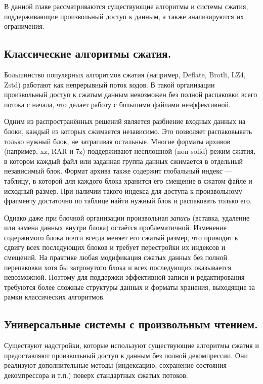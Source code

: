  \label{literature}

В данной главе рассматриваются существующие алгоритмы и системы сжатия, поддерживающие произвольный доступ к данным, а также анализируются их ограничения.

\subsection*{Классические алгоритмы сжатия.}

Большинство популярных алгоритмов сжатия (например, Deflate\cite{rfc1951_deflate}, Brotli\cite{rfc7932_brotli}, LZ4\cite{lz4_github}, Zstd\cite{rfc8878_zstd}) работают как непрерывный поток кодов. В такой организации произвольный доступ к сжатым данным невозможен без полной распаковки всего потока с начала, что делает работу с большими файлами неэффективной.

Одним из распространённых решений является разбиение входных данных на блоки, каждый из которых сжимается независимо. Это позволяет распаковывать только нужный блок, не затрагивая остальные. Многие форматы архивов (например, xz\cite{xz-utils}, RAR\cite{winrar} и 7z\cite{7zip-format}) поддерживают несплошной (non-solid) режим сжатия, в котором каждый файл или заданная группа данных сжимается в отдельный независимый блок. Формат архива также содержит глобальный индекс — таблицу, в которой для каждого блока хранится его смещение в сжатом файле и исходный размер. При наличии такого индекса для доступа к произвольному фрагменту достаточно по таблице найти нужный блок и распаковать только его.

Однако даже при блочной организации произвольная \textit{запись} (вставка, удаление или замена данных внутри блока) остаётся проблематичной. Изменение содержимого блока почти всегда меняет его сжатый размер, что приводит к сдвигу всех последующих блоков и требует перестройки их индексов и смещений. На практике любая модификация сжатых данных без полной перепаковки хотя бы затронутого блока и всех последующих оказывается невозможной. Поэтому для поддержки эффективной записи и редактирования требуются более сложные структуры данных и форматы хранения, выходящие за рамки классических алгоритмов.

\subsection*{Универсальные системы с произвольным чтением.}

Существуют надстройки, которые используют существующие алгоритмы сжатия и предоставляют произвольный доступ к данным без полной декомпрессии. Они реализуют дополнительные методы (индексацию, сохранение состояния декомпрессора и т.п.) поверх стандартных сжатых потоков.


